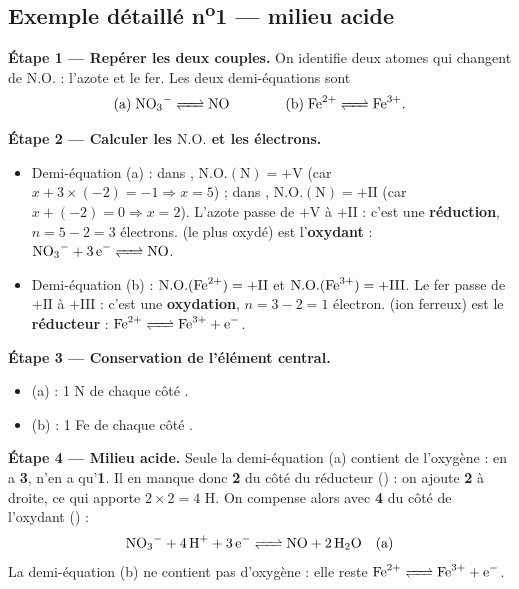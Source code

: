 \documentclass[11pt,a4paper]{article}
\newcommand{\NO}{\ensuremath{\mathrm{N.O.}}}    %
\begin{document}
\subsection{Exemple détaillé n\textsuperscript{o}1 — milieu acide}

\begin{exemple}[équilibrage en milieu acide : \ce{NO3^- + Fe^{2+} + H+ <=> NO + Fe^{3+} + H2O}]
\textbf{Étape 1 — Repérer les deux couples.} On identifie deux atomes qui changent de $\NO$ :
l'azote et le fer. Les deux demi-équations sont
\[
\text{(a)}\;\ce{NO3^- <=> NO}\qquad\qquad\text{(b)}\;\ce{Fe^{2+} <=> Fe^{3+}}.
\]

\textbf{Étape 2 — Calculer les $\NO$ et les électrons.}
\begin{itemize}[leftmargin=1.6em,topsep=1pt,itemsep=2pt]
  \item Demi-équation (a) : dans , $\NO(\mathrm{N})=+\mathrm{V}$ (car
        $x+3\times(-2)=-1\Rightarrow x=5$) ; dans , $\NO(\mathrm{N})=+\mathrm{II}$ (car
        $x+(-2)=0\Rightarrow x=2$). L'azote passe de $+\mathrm{V}$ à $+\mathrm{II}$ : c'est une
        \textbf{réduction}, $n=5-2=3$ électrons.  (le plus oxydé) est l'\textbf{oxydant} :
        $\ce{NO3^- + 3 e^- <=> NO}$.
  \item Demi-équation (b) : $\NO(\ce{Fe^{2+}})=+\mathrm{II}$ et $\NO(\ce{Fe^{3+}})=+\mathrm{III}$.
        Le fer passe de $+\mathrm{II}$ à $+\mathrm{III}$ : c'est une \textbf{oxydation},
        $n=3-2=1$ électron.  (ion ferreux) est le \textbf{réducteur} :
        $\ce{Fe^{2+} <=> Fe^{3+} + e^-}$.
\end{itemize}

\textbf{Étape 3 — Conservation de l'élément central.}
\begin{itemize}[leftmargin=1.6em,topsep=1pt,itemsep=1pt]
  \item (a) : 1 N de chaque côté \checkmark.
  \item (b) : 1 Fe de chaque côté \checkmark.
\end{itemize}

\textbf{Étape 4 — Milieu acide.} Seule la demi-équation (a) contient de l'oxygène :  en a
\textbf{3},  n'en a qu'\textbf{1}. Il en manque donc \textbf{2} du côté du réducteur
() : on ajoute \textbf{2}  à droite, ce qui apporte $2\times2=4$ H. On compense alors
avec \textbf{4}  du côté de l'oxydant () :
\[
\ce{NO3^- + 4 H+ + 3 e^- <=> NO + 2 H2O} \quad\text{(a)}
\]
La demi-équation (b) ne contient pas d'oxygène : elle reste $\ce{Fe^{2+} <=> Fe^{3+} + e^-}$.


\end{exemple}
\end{document}
